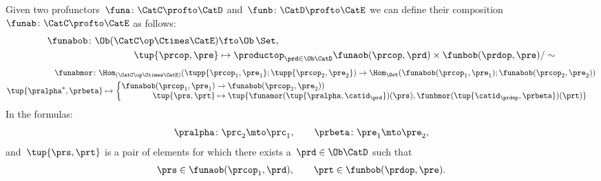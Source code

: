 \begin{widepar}
    \begin{ctdefinition}
        \label{def:profunctor-composition}
        Given two profunctors~$\funa\colon \CatC \profto \CatD$ and~$\funb\colon \CatD \profto \CatE$
        we can define their composition~$\funab\colon \CatC \profto \CatE$ as follows:
        \begin{equation}
            \begin{aligned}
                \funabob \colon \Ob(\CatC\op \Ctimes \CatE) & \fto  \Ob\, \Set, \\
                \tup{\prcop, \pre} & \mapsto \productop_{\prd\in\Ob \CatD} \funaob(\prcop, \prd) \times \funbob(\prdop, \pre) / \sim
            \end{aligned}
        \end{equation}
        \begin{equation}
            \begin{aligned}
                \funabmor  \colon \Hom_{(\CatC\op \Ctimes \CatE)}( \tupp{\prcop_1, \pre_1}; \tupp{\prcop_2, \pre_2}) \to \Hom_{\Set}( \funabob(\prcop_1, \pre_1); \funabob(\prcop_2, \pre_2)) \\
                \tup{\pralpha^\ast, \prbeta} \mapsto  \begin{cases}
                                                          \begin{aligned}
                                                              \funabob(\prcop_1, \pre_1) & \to   \funabob(\prcop_2, \pre_2)) \\
                                                              \tup{\prs, \prt} & \mapsto  \tup{
                                                                  \funamor(\tup{\pralpha, \catid_{\prd}})(\prs),
                                                                  \funbmor(\tup{\catid_{\prdop}, \prbeta})(\prt)}
                                                          \end{aligned}
                \end{cases}
            \end{aligned}
        \end{equation}
        In the formulas:
        \begin{equation}
            \pralpha\colon \prc_2 \mto \prc_1, \qquad
            \prbeta\colon \pre_1 \mto \pre_2,
        \end{equation}
        and~$\tup{\prs, \prt}$ is a pair of elements for which there exists a~$\prd\in\Ob \CatD$ such that
        \begin{equation}
            \prs \in \funaob(\prcop_1, \prd), \qquad\prt \in \funbob(\prdop, \pre).
        \end{equation}
    \end{ctdefinition}
\end{widepar}

